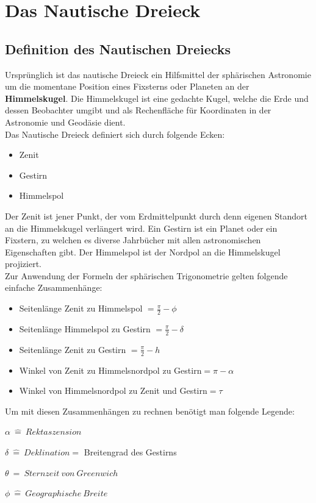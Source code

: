 \section{Das Nautische Dreieck}
\subsection{Definition des Nautischen Dreiecks}
Ursprünglich ist das nautische Dreieck ein Hilfsmittel der sphärischen Astronomie um die momentane Position eines Fixsterns oder Planeten an der \textbf{Himmelskugel}. 
Die Himmelskugel ist eine gedachte Kugel, welche die Erde und dessen Beobachter umgibt und als Rechenfläche für Koordinaten in der Astronomie und Geodäsie dient.\\
Das Nautische Dreieck definiert sich durch folgende Ecken:
\begin{itemize}
	\item Zenit 
	\item Gestirn
	\item Himmelspol
\end{itemize}
Der Zenit ist jener Punkt, der vom Erdmittelpunkt durch denn eigenen Standort an die Himmelskugel verlängert wird.
Ein Gestirn ist ein Planet oder ein Fixstern, zu welchen es diverse Jahrbücher mit allen astronomischen Eigenschaften gibt. 
Der Himmelspol ist der Nordpol an die Himmelskugel projiziert.
\\
Zur Anwendung der Formeln der sphärischen Trigonometrie gelten folgende einfache Zusammenhänge:
\begin{itemize}
	\item Seitenlänge Zenit zu Himmelspol $= \frac{\pi}{2} - \phi $
	\item Seitenlänge Himmelspol zu Gestirn $= \frac{\pi}{2} - \delta$
	\item Seitenlänge Zenit zu Gestirn $= \frac{\pi}{2} - h$
	\item Winkel von Zenit zu Himmelsnordpol zu Gestirn$=\pi - \alpha$
	\item Winkel von Himmelsnordpol zu Zenit und Gestirn$= \tau$
\end{itemize}
Um mit diesen Zusammenhängen zu rechnen benötigt man folgende Legende:

$\alpha \ \widehat{=} \ Rektaszension $

$\delta \ \widehat{=} \ Deklination =$ Breitengrad des Gestirns 

$\theta \ \widehat{=} \ Sternzeit\ von\ Greenwich$

$\phi \ \widehat{=} \ Geographische \ Breite $

